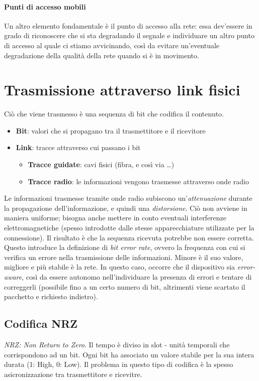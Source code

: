 \paragraph{Punti di accesso mobili}
Un altro elemento fondamentale è il punto di accesso alla rete: essa dev'essere in grado di riconoscere che si sta degradando il segnale e individuare un altro punto di accesso al quale ci stiamo avvicinando, così da evitare un'eventuale degradazione della qualità della rete quando si è in movimento.

\section{Trasmissione attraverso link fisici}
Ciò che viene trasmesso è una sequenza di bit che codifica il contenuto.
\begin{itemize}
	\item \textbf{Bit}: valori che si propagano tra il trasmettitore e il ricevitore
	\item \textbf{Link}: tracce attraverso cui passano i bit
	\begin{itemize}
		\item \textbf{Tracce guidate}: cavi fisici (fibra, e così via \ldots)
		\item \textbf{Tracce radio}: le informazioni vengono trasmesse attraverso onde radio
	\end{itemize}
\end{itemize}

Le informazioni trasmesse tramite onde radio subiscono un'\textit{attenuazione} durante la propagazione dell'informazione, e quindi una \textit{distorsione}.
Ciò non avviene in maniera uniforme; bisogna anche mettere in conto eventuali interferenze elettromagnetiche (spesso introdotte dalle stesse apparecchiature utilizzate per la connessione). Il risultato è che la sequenza ricevuta potrebbe non essere corretta. Questo introduce la definizione di \textit{bit error rate}, ovvero la frequenza con cui si verifica un errore nella trasmissione delle informazioni. Minore è il suo valore, migliore e più stabile è la rete.
In questo caso, occorre che il dispositivo sia \textit{error-aware}, così da essere autonomo nell'individuare la presenza di errori e tentare di correggerli (possibile fino a un certo numero di bit, altrimenti viene scartato il pacchetto e richiesto indietro).

\subsection{Codifica NRZ}
\textit{NRZ: Non Return to Zero}. Il tempo è diviso in slot - unità temporali che corrispondono ad un bit.
Ogni bit ha associato un valore stabile per la sua intera durata (1: High, 0: Low).
Il problema in questo tipo di codifica è la spesso asicronizzazione tra trasmettitore e ricevitre.

